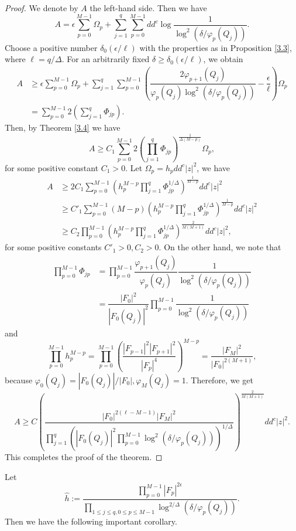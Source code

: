 \documentclass[12pt]{amsart}
\begin{document}
\begin{proof}
We denote by $A$ the left-hand side. Then we have
$$A=\epsilon\sum_{p=0}^{M-1}\Omega_p+\sum_{j=1}^q \sum_{p=0}^{M-1}dd^c\log\dfrac{1}{\log^{2}\left (\delta/\varphi_{p}(Q_j)\right)}.$$
Choose a positive number $\delta_0(\epsilon/\ell)$ with the properties as in Proposition \ref{3.3}, where $\ell=q/\Delta$. For an arbitrarily fixed $\delta\ge\delta_0(\epsilon/\ell)$, we obtain
\begin{align*}
A&\ge\epsilon\sum_{p=0}^{M-1}\Omega_p+\sum_{j=1}^q\sum_{p=0}^{M-1}\left (\dfrac{2\varphi_{p+1}(Q_j)}{\varphi_{p}(Q_j)\log^2(\delta/\varphi_{p}(Q_j))}-\dfrac{\epsilon}{\ell}\right)\Omega_p\\ 
& =\sum_{p=0}^{M-1}2\left (\sum_{j=1}^q\Phi_{jp}\right).
\end{align*}
Then, by Theorem \ref{3.4} we have
$$ A\ge C_1\sum_{p=0}^{M-1}2\left (\prod_{j=1}^q\Phi_{jp}\right)^{\frac{1}{\Delta(M-p)}}\Omega_p, $$
for some positive constant $C_1>0$. Let $\Omega_p=h_pdd^c|z|^2$, we have
\begin{align*}
A&\ge 2C_1\sum_{p=0}^{M-1}\left (h_p^{M-p}\prod_{j=1}^q\Phi_{jp}^{1/\Delta}\right)^{\frac{1}{M-p}}dd^c|z|^2\\ 
& \ge C'_1\sum_{p=0}^{M-1}(M-p)\left (h_p^{M-p}\prod_{j=1}^q\Phi_{jp}^{1/\Delta}\right)^{\frac{1}{M-p}}dd^c|z|^2\\ 
&\ge C_2\prod_{p=0}^{M-1}\left (h_p^{M-p}\prod_{j=1}^q\Phi_{jp}^{1/\Delta}\right)^{\frac{2}{M(M+1)}}dd^c|z|^2,
\end{align*}
for some positive constants $C'_1>0,C_2>0$. On the other hand, we note that
\begin{align*}
\prod_{p=0}^{M-1}\Phi_{jp}&=\prod_{p=0}^{M-1}\dfrac{\varphi_{p+1}(Q_j)}{\varphi_{p}(Q_j)}\dfrac{1}{\log^2(\delta/\varphi_{p}(Q_j))}\\ 
& =\dfrac{|F_{0}|^2}{|F_{0}(Q_j)|^2}\prod_{p=0}^{M-1}\dfrac{1}{\log^2(\delta/\varphi_{p}(Q_j))}
\end{align*}
and
$$ \prod_{p=0}^{M-1}h_p^{M-p}=\prod_{p=0}^{M-1}\left (\dfrac{|F_{p-1}|^2|F_{p+1}|^2}{|F_{p}|^4}\right)^{M-p}=\dfrac{|F_{M}|^2}{|F_{0}|^{2(M+1)}},$$
because $\varphi_{0}(Q_j)=|F_{0}(Q_j)|/|F_{0}|,\varphi_{M}(Q_j)=1$. Therefore, we get
$$ A\ge C\left (\dfrac{|F_{0}|^{2(\ell-M-1)}|F_{M}|^2}{\prod_{j=1}^q(|F_{0}(Q_j)|^2\prod_{p=0}^{M-1}\log^2(\delta/\varphi_{p}(Q_j)))^{1/\Delta}}\right)^{\frac{2}{M(M+1)}}dd^c|z|^2.$$
This completes the proof of the theorem.
\end{proof}

Let
$$\hat{h} := \dfrac{\prod_{p=0}^{M-1}|F_{p}|^{2\epsilon}}{\prod_{1\le j\le q,0\le p\le M-1}\log^{2/\Delta}\left(\delta/\varphi_{p}(Q_j)\right)}.$$
Then we have the following important corollary.
\end{document}
